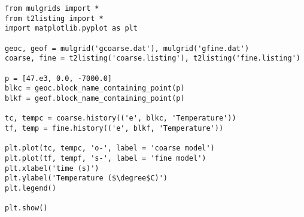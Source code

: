 \begin{lstlisting}
from mulgrids import *
from t2listing import *
import matplotlib.pyplot as plt

geoc, geof = mulgrid('gcoarse.dat'), mulgrid('gfine.dat')
coarse, fine = t2listing('coarse.listing'), t2listing('fine.listing')

p = [47.e3, 0.0, -7000.0]
blkc = geoc.block_name_containing_point(p)
blkf = geof.block_name_containing_point(p)

tc, tempc = coarse.history(('e', blkc, 'Temperature'))
tf, temp = fine.history(('e', blkf, 'Temperature'))

plt.plot(tc, tempc, 'o-', label = 'coarse model')
plt.plot(tf, tempf, 's-', label = 'fine model')
plt.xlabel('time (s)')
plt.ylabel('Temperature ($\degree$C)')
plt.legend()

plt.show()
\end{lstlisting}

